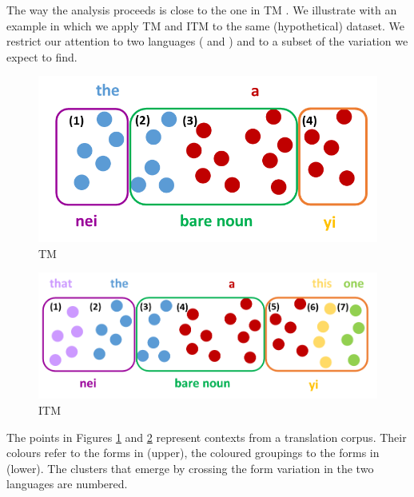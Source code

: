 \documentclass[output=paper,
modfonts
]{langscibook}
\begin{document}
The way the analysis proceeds is close to the one in TM \citep[e.g.][]{deSwart2017}. We illustrate with an example in which we apply TM and ITM to the same (hypothetical) dataset. We restrict our attention to two languages ( and ) and to a subset of the variation we expect to find.

\begin{figure}[t]
\includegraphics[height=.2\textheight]{figures/TM.png}
\caption{TM}
\label{fig:lebruyn:3}
\end{figure}

\begin{figure}[t]
	\includegraphics[height=.2\textheight]{figures/ITM.png}
	\caption{ITM}
	\label{fig:lebruyn:4}
\end{figure}

The points in Figures \ref{fig:lebruyn:3} and \ref{fig:lebruyn:4} represent contexts from a translation corpus. Their colours refer to the forms in  (upper), the coloured groupings to the forms in  (lower). The clusters that emerge by crossing the form variation in the two languages are numbered.
\end{document}
